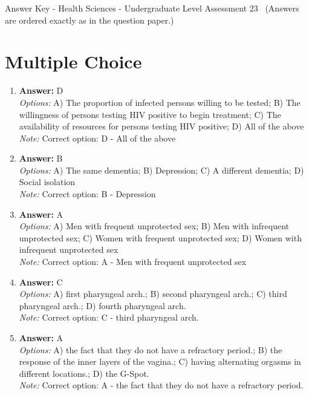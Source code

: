 \documentclass[12pt]{article}
\begin{document}
\begin{center}
Answer Key - Health Sciences - Undergraduate Level Assessment 23 \
\small (Answers are ordered exactly as in the question paper.)
\end{center}

\section*{Multiple Choice}
\begin{enumerate}[label=\arabic*.]
\item \textbf{Answer:} D
\\ \textit{Options:} A) The proportion of infected persons willing to be tested; B) The willingness of persons testing HIV positive to begin treatment; C) The availability of resources for persons testing HIV positive; D) All of the above
\\ \textit{Note:} Correct option: D - All of the above
\item \textbf{Answer:} B
\\ \textit{Options:} A) The same dementia; B) Depression; C) A different dementia; D) Social isolation
\\ \textit{Note:} Correct option: B - Depression
\item \textbf{Answer:} A
\\ \textit{Options:} A) Men with frequent unprotected sex; B) Men with infrequent unprotected sex; C) Women with frequent unprotected sex; D) Women with infrequent unprotected sex
\\ \textit{Note:} Correct option: A - Men with frequent unprotected sex
\item \textbf{Answer:} C
\\ \textit{Options:} A) first pharyngeal arch.; B) second pharyngeal arch.; C) third pharyngeal arch.; D) fourth pharyngeal arch.
\\ \textit{Note:} Correct option: C - third pharyngeal arch.
\item \textbf{Answer:} A
\\ \textit{Options:} A) the fact that they do not have a refractory period.; B) the response of the inner layers of the vagina.; C) having alternating orgasms in different locations.; D) the G-Spot.
\\ \textit{Note:} Correct option: A - the fact that they do not have a refractory period.
\end{enumerate}
\end{document}
